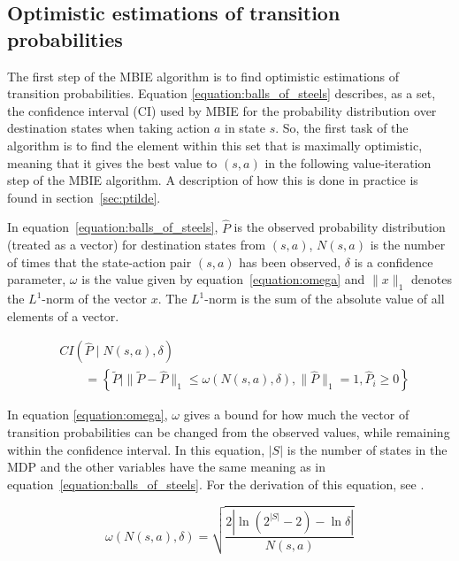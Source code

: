 \subsection{Optimistic estimations of transition probabilities}
\label{sec:computep}

The first step of the MBIE algorithm is to find optimistic estimations of
transition probabilities. Equation \eqref{equation:balls_of_steels} describes,
as a set, the confidence interval (CI) used by MBIE for the probability
distribution over destination states when taking action $a$ in state $s$. So,
the first task of the algorithm is to find the element within this set that is
maximally optimistic, meaning that it gives the best value to $(s,a)$ in the
following value-iteration step of the MBIE algorithm. A description of how this
is done in practice is found in section~\ref{sec:ptilde}. 

In equation~\eqref{equation:balls_of_steels}, $\hat{P}$ is the observed
probability distribution (treated as a vector) for destination states from
$(s,a)$, $N(s,a)$ is the number of times that the state-action pair $(s,a)$ has
been observed, $\delta$ is a confidence parameter,  $\omega$ is the value given
by equation~\eqref{equation:omega} and $\|x\|_1$ denotes the $L^1$-norm of the vector $x$.
The $L^1$-norm is the sum of the absolute value of all elements of a vector. 

\begin{align}
\label{equation:balls_of_steels}
& CI\left(\hat{P} \mid N(s, a), \delta\right) \nonumber \\
& \qquad = \left\{\tilde{P} \mid \|\tilde{P} - \hat{P}\|_1 \le \omega(N(s,a), \delta), \|\hat{P}\|_1 = 1, \hat{P}_i \geq 0  \right\}
\end{align}

In equation \eqref{equation:omega}, $\omega$ gives a bound for how much the
vector of transition probabilities can be changed from the observed values,
while remaining within the confidence interval. In this equation, $|S|$ is the
number of states in the MDP and the other variables have the same meaning as in
equation~\eqref{equation:balls_of_steels}. For the derivation of this equation,
see \textcite{Strehl20081309}.

\begin{equation}
\label{equation:omega}
   \omega(N(s,a),\delta) = {\sqrt{\frac{2|\ln(2^{|S|}-2) - \ln  \delta |}{N(s,a)}}}
\end{equation}
